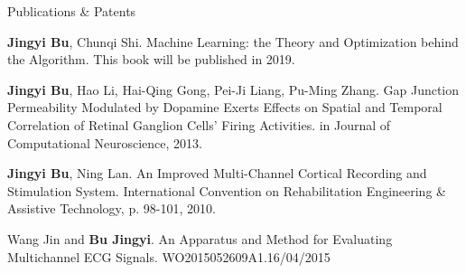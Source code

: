 \documentclass{resume} %
\begin{document}
\begin{rSection}{Publications \& Patents}

\begin{rSubsection}{}{}{}{}
\item \textbf{Jingyi Bu}, Chunqi Shi. Machine Learning: the Theory and Optimization behind the Algorithm. This book will be published in 2019.
\\
\item \textbf{Jingyi Bu}, Hao Li, Hai-Qing Gong, Pei-Ji Liang, Pu-Ming Zhang. Gap Junction Permeability Modulated by Dopamine Exerts Effects on Spatial and Temporal Correlation of Retinal Ganglion Cells' Firing Activities. in Journal of Computational Neuroscience, 2013.
\\
\item \textbf{Jingyi Bu}, Ning Lan. An Improved Multi-Channel Cortical Recording and Stimulation System. International Convention on Rehabilitation Engineering \& Assistive Technology, p. 98-101, 2010.
\\
\item Wang Jin and \textbf{Bu Jingyi}. An Apparatus and Method for Evaluating Multichannel ECG Signals. WO2015052609A1.16/04/2015
\end{rSubsection}

\end{rSection}










\end{document}
